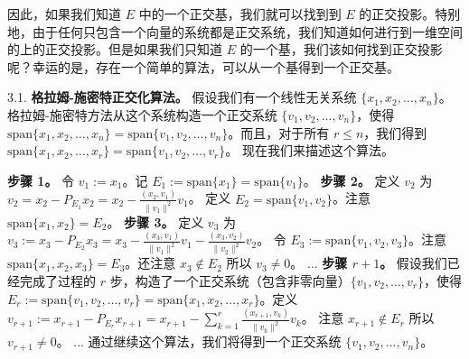 因此，如果我们知道 $E$ 中的一个正交基，我们就可以找到到 $E$ 的正交投影。特别地，由于任何只包含一个向量的系统都是正交系统，我们知道如何进行到一维空间的上的正交投影。但是如果我们只知道 $E$ 的一个基，我们该如何找到正交投影呢？幸运的是，存在一个简单的算法，可以从一个基得到一个正交基。

3.1. \textbf{格拉姆-施密特正交化算法。} 假设我们有一个线性无关系统 $\{x_1, x_2, \dots, x_n\}$。格拉姆-施密特方法从这个系统构造一个正交系统 $\{v_1, v_2, \dots, v_n\}$，使得 $\text{span}\{x_1, x_2, \dots, x_n\} = \text{span}\{v_1, v_2, \dots, v_n\}$。而且，对于所有 $r \leq n$，我们得到 $\text{span}\{x_1, x_2, \dots, x_r\} = \text{span}\{v_1, v_2, \dots, v_r\}$。
现在我们来描述这个算法。

\textbf{步骤 1。} 令 $v_1 := x_1$。记 $E_1 := \text{span}\{x_1\} = \text{span}\{v_1\}$。
\textbf{步骤 2。} 定义 $v_2$ 为
$v_2 = x_2 - P_{E_1} x_2 = x_2 - \frac{(x_2, v_1)}{\|v_1\|^2} v_1$。
定义 $E_2 = \text{span}\{v_1, v_2\}$。注意 $\text{span}\{x_1, x_2\} = E_2$。
\textbf{步骤 3。} 定义 $v_3$ 为
$v_3 := x_3 - P_{E_2} x_3 = x_3 - \frac{(x_3, v_1)}{\|v_1\|^2} v_1 - \frac{(x_3, v_2)}{\|v_2\|^2} v_2$。
令 $E_3 := \text{span}\{v_1, v_2, v_3\}$。注意 $\text{span}\{x_1, x_2, x_3\} = E_3$。还注意 $x_3 \notin E_2$ 所以 $v_3 \neq 0$。
...
\textbf{步骤 $r+1$。} 假设我们已经完成了过程的 $r$ 步，构造了一个正交系统（包含非零向量）$\{v_1, v_2, \dots, v_r\}$，使得 $E_r := \text{span}\{v_1, v_2, \dots, v_r\} = \text{span}\{x_1, x_2, \dots, x_r\}$。定义
$v_{r+1} := x_{r+1} - P_{E_r} x_{r+1} = x_{r+1} - \sum_{k=1}^r \frac{(x_{r+1}, v_k)}{\|v_k\|^2} v_k$。
注意 $x_{r+1} \notin E_r$ 所以 $v_{r+1} \neq 0$。
...
通过继续这个算法，我们将得到一个正交系统 $\{v_1, v_2, \dots, v_n\}$。

